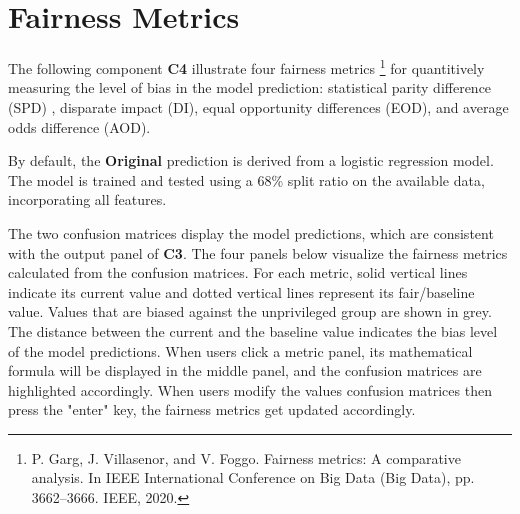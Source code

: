 \section{Fairness Metrics}

The following component \textbf{C4} illustrate four fairness metrics 
\footnote{P. Garg, J. Villasenor, and V. Foggo. Fairness metrics: A comparative analysis. In IEEE International Conference on Big Data (Big Data), pp. 3662–3666. IEEE, 2020.} 
for quantitively measuring the level of bias in the model prediction: statistical parity difference (SPD) , disparate impact (DI), equal opportunity differences (EOD), and average odds difference (AOD).

\begin{visualComponent}
\end{visualComponent}

\begin{boxK}
    By default, the \textbf{Original} prediction is derived from a logistic regression model. The model is trained and tested using a 68\% split ratio on the available data, incorporating all features.
\end{boxK}

\par The two confusion matrices display the model predictions, which are consistent with the output panel of \textbf{C3}. 
The four panels below visualize the fairness metrics calculated from the confusion matrices. For each metric, solid vertical lines indicate its current value and dotted vertical lines represent its fair/baseline value. 
Values that are biased against the unprivileged group are shown in grey. The distance between the current and the baseline value indicates the bias level of the model predictions. 
When users click a metric panel, its mathematical formula will be displayed in the middle panel, and the confusion matrices are highlighted accordingly.
When users modify the values confusion matrices then press the "enter" key, the fairness metrics get updated accordingly.
